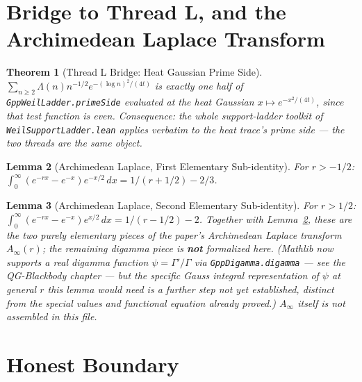 \documentclass{report}
\newtheorem{theorem}{Theorem}[chapter]
\newtheorem{lemma}[theorem]{Lemma}
\theoremstyle{definition}
\begin{document}
\section{Bridge to Thread L, and the Archimedean Laplace Transform}

\begin{theorem}[Thread L Bridge: Heat Gaussian Prime Side]
  \label{thm:prime-side-heat-gaussian}
  \leanok
  $\sum_{n\geq 2}\Lambda(n)n^{-1/2}e^{-(\log n)^2/(4t)}$ is exactly one half of
  \texttt{GppWeilLadder.primeSide} evaluated at the heat Gaussian
  $x\mapsto e^{-x^2/(4t)}$, since that test function is even. Consequence: the whole
  support-ladder toolkit of \texttt{WeilSupportLadder.lean} applies verbatim to the heat
  trace's prime side --- the two threads are the same object.
\end{theorem}

\begin{lemma}[Archimedean Laplace, First Elementary Sub-identity]
  \label{lem:archimedean-laplace-aux-one}
  \leanok
  For $r>-1/2$: $\int_0^\infty(e^{-rx}-e^{-x})e^{-x/2}\,dx = 1/(r+1/2)-2/3$.
\end{lemma}

\begin{lemma}[Archimedean Laplace, Second Elementary Sub-identity]
  \label{lem:archimedean-laplace-aux-two}
  \leanok
  For $r>1/2$: $\int_0^\infty(e^{-rx}-e^{-x})e^{x/2}\,dx = 1/(r-1/2)-2$. Together with
  Lemma~\ref{lem:archimedean-laplace-aux-one}, these are the two purely elementary pieces of
  the paper's Archimedean Laplace transform $A_\infty(r)$; the remaining digamma piece is
  \textbf{not} formalized here. (Mathlib now supports a real digamma function
  $\psi=\Gamma'/\Gamma$ via \texttt{GppDigamma.digamma} --- see the QG-Blackbody chapter ---
  but the specific Gauss integral representation of $\psi$ at general $r$ this lemma would
  need is a further step not yet established, distinct from the special values and functional
  equation already proved.) $A_\infty$ itself is not assembled in this file.
\end{lemma}

\section{Honest Boundary}
\end{document}
